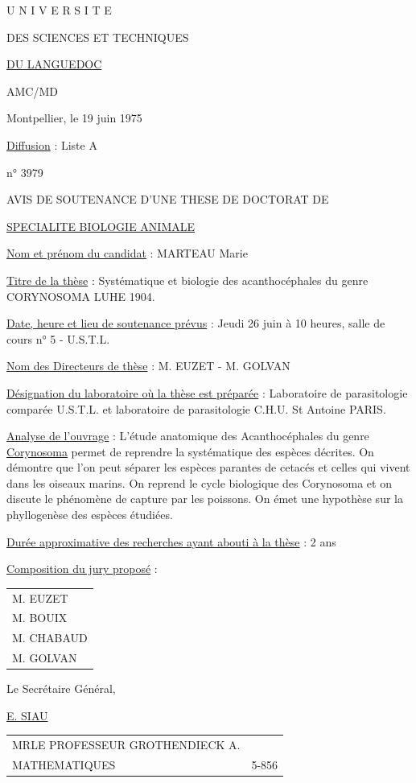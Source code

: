 
U N I V E R S I T E\par
DES SCIENCES ET TECHNIQUES\par
\uline{DU LANGUEDOC}\par
AMC/MD

Montpellier, le 19 juin 1975

\uline{Diffusion} : Liste A\par
n° 3979

AVIS DE SOUTENANCE D'UNE THESE DE DOCTORAT DE\par
\uline{SPECIALITE BIOLOGIE ANIMALE}

\uline{Nom et prénom du candidat} : MARTEAU Marie

\uline{Titre de la thèse} : Systématique et biologie des acanthocéphales du genre
CORYNOSOMA LUHE 1904.

\uline{Date, heure et lieu de soutenance prévus} : Jeudi 26 juin à 10 heures, salle de
cours n° 5 - U.S.T.L.

\uline{Nom des Directeurs de thèse} : M. EUZET - M. GOLVAN

\uline{Désignation du laboratoire où la thèse est préparée} : Laboratoire de parasitologie
comparée U.S.T.L. et laboratoire de parasitologie C.H.U. St Antoine PARIS.

\uline{Analyse de l'ouvrage} : L'étude anatomique des Acanthocéphales du genre \uline{Corynosoma}
permet de reprendre la systématique des espèces décrites. On démontre que l'on
peut séparer les espèces parantes de cetacés et celles qui vivent dans les
oiseaux marins. On reprend le cycle biologique des Corynosoma et on discute
le phénomène de capture par les poissons. On émet une hypothèse sur la phyllogenèse
des espèces étudiées.

\uline{Durée approximative des recherches ayant abouti à la thèse} : 2 ans

\uline{Composition du jury proposé} :\quad\begin{tabular}[t]{l}M. EUZET\\M. BOUIX\\M. CHABAUD\\M. GOLVAN\end{tabular}

Le Secrétaire Général,

\uline{E. SIAU}

\begin{tabular}{ll}
MR\quad LE PROFESSEUR GROTHENDIECK A.&\\[1em]
MATHEMATIQUES&5-856
\end{tabular}

